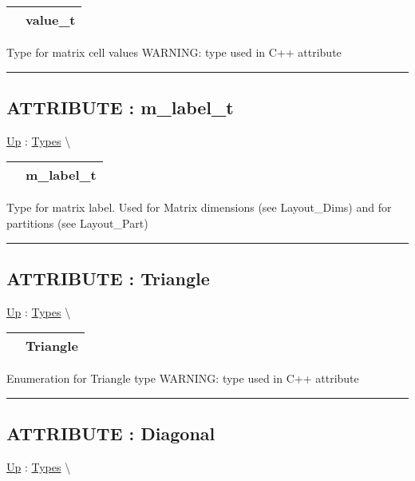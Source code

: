 {\renewcommand{\arraystretch}{1.5}
\begin{tabularx}{\textwidth}{|>{\raggedright\arraybackslash}l|X|}
\hline
\hspace{0pt} & value\_t \\
\hline
\end{tabularx}
}

\par
Type for matrix cell values WARNING: type used in C++ attribute


\rule{\linewidth}{0.5pt}
\subsection*{ATTRIBUTE : m\_label\_t}
\hypertarget{ecldoc:pbblas.types.m_label_t}{}
\hyperlink{ecldoc:PBblas.Types}{Up} :
\hspace{0pt} \hyperlink{ecldoc:PBblas.Types}{Types} \textbackslash 

{\renewcommand{\arraystretch}{1.5}
\begin{tabularx}{\textwidth}{|>{\raggedright\arraybackslash}l|X|}
\hline
\hspace{0pt} & m\_label\_t \\
\hline
\end{tabularx}
}

\par
Type for matrix label. Used for Matrix dimensions (see Layout\_Dims) and for partitions (see Layout\_Part)


\rule{\linewidth}{0.5pt}
\subsection*{ATTRIBUTE : Triangle}
\hypertarget{ecldoc:ecldoc-Triangle}{}
\hyperlink{ecldoc:PBblas.Types}{Up} :
\hspace{0pt} \hyperlink{ecldoc:PBblas.Types}{Types} \textbackslash 

{\renewcommand{\arraystretch}{1.5}
\begin{tabularx}{\textwidth}{|>{\raggedright\arraybackslash}l|X|}
\hline
\hspace{0pt} & Triangle \\
\hline
\end{tabularx}
}

\par
Enumeration for Triangle type WARNING: type used in C++ attribute


\rule{\linewidth}{0.5pt}
\subsection*{ATTRIBUTE : Diagonal}
\hypertarget{ecldoc:ecldoc-Diagonal}{}
\hyperlink{ecldoc:PBblas.Types}{Up} :
\hspace{0pt} \hyperlink{ecldoc:PBblas.Types}{Types} \textbackslash 

